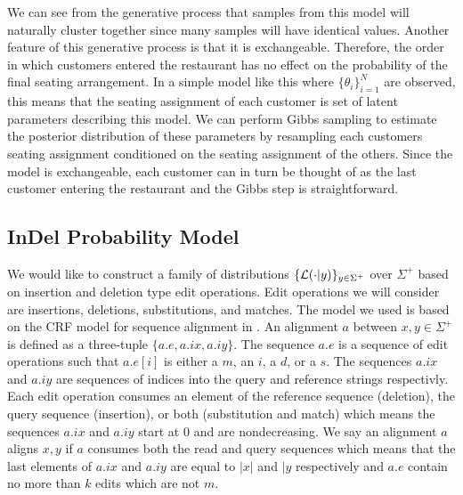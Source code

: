 We can see from the generative process that samples from this model will naturally cluster together since many samples will have identical values.  Another feature of this generative process is that it is exchangeable. Therefore, the order in which customers entered the restaurant has no effect on the probability of the final seating arrangement. In a simple model like this where $\{\theta_i\}_{i = 1}^N$ are observed, this means that the seating assignment of each customer is set of latent parameters describing this model.  We can perform Gibbs sampling to estimate the posterior distribution of these parameters by resampling each customers seating assignment conditioned on the seating assignment of the others.  Since the model is exchangeable, each customer can in turn be thought of as the last customer entering the restaurant and the Gibbs step is straightforward.

\subsection{InDel Probability Model}
\label{subsection_indel_probability_model}
We would like to construct a family of distributions $\{ \likelihood( \cdot | y) \}_{y \in \Sigma^+}$ over $\Sigma^+$ based on insertion and deletion type edit operations.  Edit operations we will consider are insertions, deletions, substitutions, and matches.  The model we used is based on the CRF model for sequence alignment in \cite{McCallum, Ballare, and Pereira}. An alignment $a$ between $x,y \in \Sigma^+$ is defined as a three-tuple $\{a.e, a.ix, a.iy\}$.  The sequence $a.e$ is a sequence of edit operations such that $a.e[i]$ is either a $m$, an $i$, a $d$, or a $s$.  The sequences $a.ix$ and $a.iy$ are sequences of indices into the query and reference strings respectivly.  Each edit operation consumes an element of the reference sequence (deletion), the query sequence (insertion), or both (substitution and match) which means the sequences $a.ix$ and $a.iy$ start at 0 and are nondecreasing.  We say an alignment $a$ aligns $x,y$ if $a$ consumes both the read and query sequences which means that the last elements of $a.ix$ and $a.iy$ are equal to $|x|$ and $|y$ respectively and $a.e$ contain no more than $k$ edits which are not $m$.



